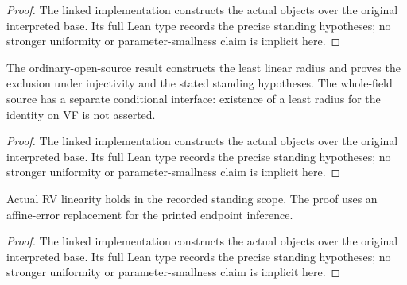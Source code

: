 \begin{proof}


\leanok

The linked implementation constructs the actual objects over the original interpreted base. Its full Lean type records the precise standing hypotheses; no stronger uniformity or parameter-smallness claim is implicit here.

\end{proof}

\begin{corollary}

\label{s3-17}


\leanok

The ordinary-open-source result constructs the least linear radius and proves the exclusion under injectivity and the stated standing hypotheses. The whole-field source has a separate conditional interface: existence of a least radius for the identity on VF is not asserted.

\end{corollary}

\begin{proof}


\leanok

The linked implementation constructs the actual objects over the original interpreted base. Its full Lean type records the precise standing hypotheses; no stronger uniformity or parameter-smallness claim is implicit here.

\end{proof}

\begin{lemma}[3.18: RV linearity]

\label{s3-18}


\leanok

Actual RV linearity holds in the recorded standing scope. The proof uses an affine-error replacement for the printed endpoint inference.

\end{lemma}

\begin{proof}


\leanok

The linked implementation constructs the actual objects over the original interpreted base. Its full Lean type records the precise standing hypotheses; no stronger uniformity or parameter-smallness claim is implicit here.

\end{proof}

